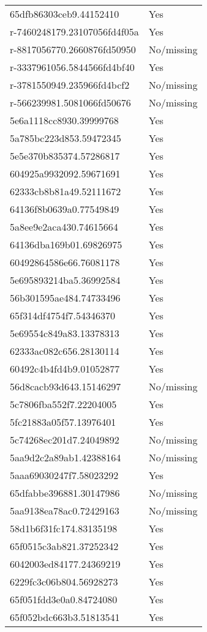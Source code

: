 \begin{tabular}{ll}
65dfb86303ceb9.44152410 & Yes \\
r-7460248179.23107056fd4f05a & Yes \\
r-8817056770.2660876fd50950 & No/missing \\
r-3337961056.5844566fd4bf40 & Yes \\
r-3781550949.235966fd4bcf2 & No/missing \\
r-566239981.5081066fd50676 & No/missing \\
5e6a1118cc8930.39999768 & Yes \\
5a785bc223d853.59472345 & Yes \\
5e5e370b835374.57286817 & Yes \\
604925a9932092.59671691 & Yes \\
62333cb8b81a49.52111672 & Yes \\
64136f8b0639a0.77549849 & Yes \\
5a8ee9e2aca430.74615664 & Yes \\
64136dba169b01.69826975 & Yes \\
60492864586e66.76081178 & Yes \\
5e695893214ba5.36992584 & Yes \\
56b301595ae484.74733496 & Yes \\
65f314df4754f7.54346370 & Yes \\
5e69554c849a83.13378313 & Yes \\
62333ac082c656.28130114 & Yes \\
60492c4b4fd4b9.01052877 & Yes \\
56d8cacb93d643.15146297 & No/missing \\
5c7806fba552f7.22204005 & Yes \\
5fc21883a05f57.13976401 & Yes \\
5c74268ec201d7.24049892 & No/missing \\
5aa9d2c2a89ab1.42388164 & No/missing \\
5aaa69030247f7.58023292 & Yes \\
65dfabbe396881.30147986 & No/missing \\
5aa9138ea78ac0.72429163 & No/missing \\
58d1b6f31fc174.83135198 & Yes \\
65f0515c3ab821.37252342 & Yes \\
6042003ed84177.24369219 & Yes \\
6229fc3c06b804.56928273 & Yes \\
65f051fdd3e0a0.84724080 & Yes \\
65f052bdc663b3.51813541 & Yes \\

\end{tabular}

